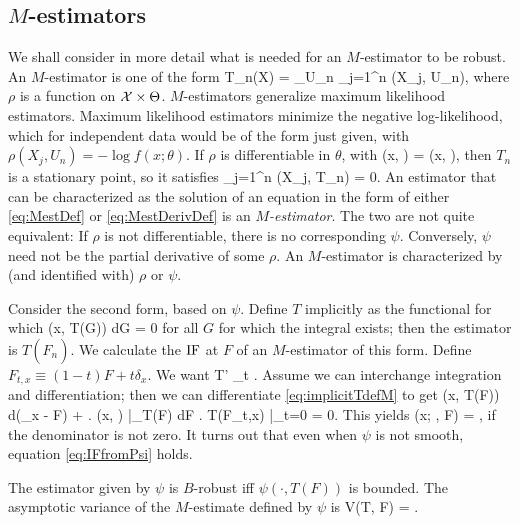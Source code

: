 \subsection{$M$-estimators}
We shall consider in more detail what is needed for an $M$-estimator
to be robust.
An $M$-estimator is one of the form
\beq \label{eq:MestDef}
    T_n(X) = \arg \min_{U_n} \sum_{j=1}^n \rho(X_j, U_n),
\eeq
where $\rho$ is a function on ${\cal X} \times \Theta$.
$M$-estimators generalize maximum likelihood estimators.
Maximum likelihood estimators minimize the negative log-likelihood, which
for independent data would be of the form just given, with
$\rho(X_j, U_n) = -\log f(x; \theta)$.
If $\rho$ is differentiable in $\theta$, with
\beq
    \psi(x, \theta) = \frac{\partial}{\partial\theta}\rho(x, \theta),
\eeq
then $T_n$ is a stationary point, so it satisfies
\beq  \label{eq:MestDerivDef}
    \sum_{j=1}^n \psi(X_j, T_n) = 0.
\eeq
An estimator that can be characterized as the solution of an 
equation in the form of either
\ref{eq:MestDef} or \ref{eq:MestDerivDef} is an {\em $M$-estimator}.
The two are not quite equivalent:
If $\rho$ is not differentiable, there is no corresponding $\psi$.
Conversely, $\psi$ need not be the partial derivative of some $\rho$.
An $M$-estimator is characterized by (and identified with) $\rho$ or $\psi$.

Consider the second form, based on $\psi$.
Define $T$ implicitly as the functional for which
\beq \label{eq:implicitTdefM}
    \int \psi(x, T(G)) dG = 0
\eeq
for all $G$ for which the integral exists; then the estimator is $T(\hat{F}_n)$.
We calculate the ${\rm IF}$ at $F$ of an $M$-estimator of this form.
Define $F_{t,x} \equiv (1-t)F + t\delta_x$.
We want 
\beq
    T' \equiv \lim_{t } .
\eeq
Assume we can interchange
integration and differentiation;
then we can differentiate \ref{eq:implicitTdefM}
to get
\beq
    \int \psi(x, T(F)) d(\delta_x - F) + \int \left . \frac{\partial}{\partial\theta}
    \psi(x, \theta) \right |_{T(F)} dF \cdot \left .
     T(F_{t,x}) \right |_{t=0} = 0.
\eeq
This yields
\beq \label{eq:IFfromPsi}
    \IF(x; \psi, F) = ,
\eeq
if the denominator is not zero.
It turns out that even when $\psi$ is not smooth, equation \ref{eq:IFfromPsi}
holds.

The estimator given by $\psi$ is $B$-robust iff $\psi(\cdot, T(F))$ is
bounded.
The asymptotic variance of the $M$-estimate defined by $\psi$ is
\beq
    V(T, F) = .
\eeq

